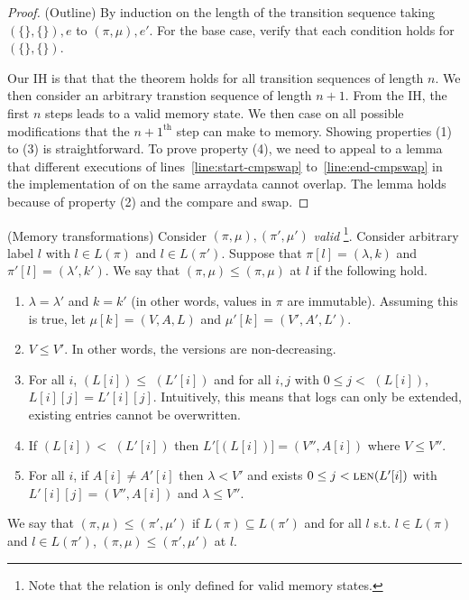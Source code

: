 \begin{proof}
(Outline) By induction on the length of the transition sequence taking $(\{\}, \{\}), e$ to $(\pi, \mu), e'$. For the base case, verify that each condition holds for $(\{\}, \{\})$. 

Our IH is that that the theorem holds for all transition sequences of length $n$. We then consider an arbitrary transtion sequence of length $n+1$. From the IH, the first $n$ steps leads to a valid memory state. We then case on all possible modifications that the $n+1^{\text{th}}$ step can make to memory. Showing properties (1) to (3) is straightforward. To prove property (4), we need to appeal to a lemma that different executions of lines~\ref{line:start-cmpswap} to~\ref{line:end-cmpswap} in the implementation of \set{} on the same arraydata cannot overlap. The lemma holds because of property (2) and the compare and swap.
\end{proof}

\begin{definition}
(Memory transformations) Consider $(\pi, \mu), (\pi', \mu')$ \emph{valid} \footnote{Note that the relation is only defined for valid memory states.}. Consider arbitrary label $l$ with $l \in L(\pi)$ and $l \in L(\pi')$. Suppose that $\pi[l] = (\lambda, k)$ and $\pi'[l] = (\lambda', k')$. We say that $(\pi, \mu) \leq (\pi, \mu)$ at $l$ if the following hold.
\begin{enumerate}
\item $\lambda = \lambda'$ and $k = k'$ (in other words, values in $\pi$ are immutable). Assuming this is true, let $\mu[k] = (V, A, L)$ and $\mu'[k] = (V', A', L')$.
\item $V \leq V'$. In other words, the versions are non-decreasing.
\item For all $i$, $(L[i]) \leq$ $(L'[i])$ and for all $i, j$ with $0 \leq j < $ $(L[i])$, $L[i][j] = L'[i][j]$. Intuitively, this means that logs can only be extended, existing entries cannot be overwritten.
\item If $(L[i]) <$ $(L'[i])$ then $L'[$$(L[i])] = (V'', A[i])$ where $V \leq V''$.
\item For all $i$, if $A[i] \neq A'[i]$ then $\lambda < V'$ and exists $0 \leq j < \text{{\sc len}}(L'[i])$ with $L'[i][j] = (V'', A[i])$ and $\lambda \leq V''$.
\end{enumerate}
We say that $(\pi, \mu) \leq (\pi', \mu')$ if $L(\pi) \subseteq L(\pi')$ and for all $l$ s.t. $l \in L(\pi)$ and $l \in L(\pi')$, $(\pi, \mu) \leq (\pi', \mu')$ at $l$.
\end{definition}

